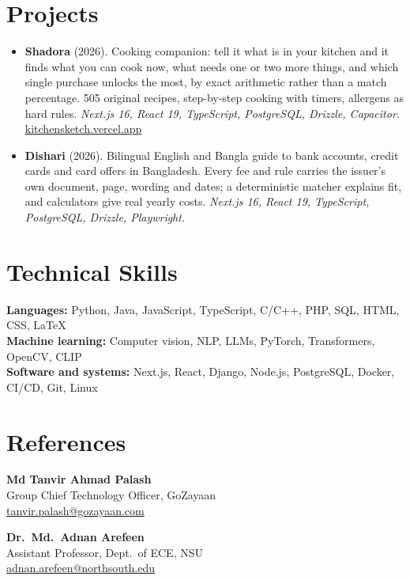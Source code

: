 \documentclass[10pt,letterpaper]{article}
\begin{document}
\section{Projects}
\begin{itemize}
  \item \textbf{Shadora} (2026). Cooking companion: tell it what is in your kitchen and it finds
    what you can cook now, what needs one or two more things, and which single purchase unlocks the
    most, by exact arithmetic rather than a match percentage. 505 original recipes, step-by-step
    cooking with timers, allergens as hard rules. \textit{Next.js 16, React 19, TypeScript,
    PostgreSQL, Drizzle, Capacitor.} \href{https://kitchensketch.vercel.app}{kitchensketch.vercel.app}
  \item \textbf{Dishari} (2026). Bilingual English and Bangla guide to bank accounts, credit cards
    and card offers in Bangladesh. Every fee and rule carries the issuer's own document, page,
    wording and dates; a deterministic matcher explains fit, and calculators give real yearly costs.
    \textit{Next.js 16, React 19, TypeScript, PostgreSQL, Drizzle, Playwright.}
\end{itemize}

\section{Technical Skills}
\textbf{Languages:} Python, Java, JavaScript, TypeScript, C/C++, PHP, SQL, HTML, CSS, LaTeX\\
\textbf{Machine learning:} Computer vision, NLP, LLMs, PyTorch, Transformers, OpenCV, CLIP\\
\textbf{Software and systems:} Next.js, React, Django, Node.js, PostgreSQL, Docker, CI/CD, Git, Linux

\section{References}
\noindent
\begin{minipage}[t]{0.48\textwidth}
\raggedright
\textbf{Md Tanvir Ahmad Palash}\\
Group Chief Technology Officer, GoZayaan\\
\href{mailto:tanvir.palash@gozayaan.com}{tanvir.palash@gozayaan.com}
\end{minipage}\hfill
\begin{minipage}[t]{0.48\textwidth}
\raggedright
\textbf{Dr.\ Md.\ Adnan Arefeen}\\
Assistant Professor, Dept.\ of ECE, NSU\\
\href{mailto:adnan.arefeen@northsouth.edu}{adnan.arefeen@northsouth.edu}
\end{minipage}
\end{document}
